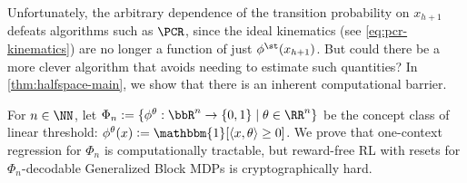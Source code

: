 Unfortunately, the arbitrary dependence of the transition probability on $x_{h+1}$  defeats algorithms such as $\PCR$, since the ideal kinematics (see \cref{eq:pcr-kinematics}) are no longer a function of just $\phi^\st(x_{h+1})$. But could there be a more clever algorithm that avoids needing to estimate such quantities? In \cref{thm:halfspace-main}, we show that there is an inherent computational barrier. %

\iffalse
\begin{definition}\label{def:halfspace-mdps}
Fix $n \in \NN$. We define $\MM_n$ to be the family of $\Phi_n$-decodable Generalized Block MDPs with horizon $H := (\log n)^{\log \log n}$, observation space $\MX = \RR^n$, latent state space $\MS = \{0,1\}$, action space $\MA = \{0,1\}$, and feature class $\Phi_n = \{\phi^\theta: \theta \in \RR^n\}$ consisting of linear threshold functions, i.e. where 
\[\phi^\theta(x) := \mathbbm{1}[\langle x,\theta\rangle \geq 0].\]
\end{definition}
\fi



For $n \in \NN$, let $\Phi_n := \{\phi^\theta:\bbR^{n}\to\crl{0,1}\mid{}\theta\in\RR^n\}$ be the concept class of linear threshold: $\phi^\theta(x) \ldef \mathbbm{1}[\langle x,\theta\rangle \geq 0]$. We prove that one-context regression for $\Phi_n$ is computationally tractable, but reward-free RL with resets for $\Phi_n$-decodable Generalized Block MDPs is cryptographically hard.

